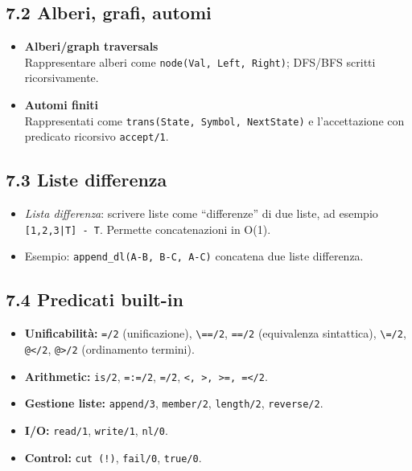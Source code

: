 \documentclass[12pt]{article}
\begin{document}
\subsection*{7.2 Alberi, grafi, automi}

\begin{itemize}
  \item \textbf{Alberi/graph traversals}\\
    Rappresentare alberi come \texttt{node(Val, Left, Right)}; DFS/BFS scritti ricorsivamente.
  \item \textbf{Automi finiti}\\
    Rappresentati come \texttt{trans(State, Symbol, NextState)} e l’accettazione con predicato ricorsivo \texttt{accept/1}.
\end{itemize}

\subsection*{7.3 Liste differenza}

\begin{itemize}
  \item \emph{Lista differenza}: scrivere liste come “differenze” di due liste, ad esempio \texttt{[1,2,3|T] - T}. Permette concatenazioni in O(1).
  \item Esempio: \texttt{append\_dl(A-B, B-C, A-C)} concatena due liste differenza.
\end{itemize}

\subsection*{7.4 Predicati built-in}

\begin{itemize}
  \item \textbf{Unificabilità:} \texttt{=/2} (unificazione), \texttt{\textbackslash==/2}, \texttt{==/2} (equivalenza sintattica), \texttt{\textbackslash=/2}, \texttt{@</2}, \texttt{@>/2} (ordinamento termini).
  \item \textbf{Arithmetic:} \texttt{is/2}, \texttt{=:=/2}, \texttt{=\=/2}, \texttt{<, >, >=, =</2}.
  \item \textbf{Gestione liste:} \texttt{append/3}, \texttt{member/2}, \texttt{length/2}, \texttt{reverse/2}.
  \item \textbf{I/O:} \texttt{read/1}, \texttt{write/1}, \texttt{nl/0}.
  \item \textbf{Control:} \texttt{cut (!)}, \texttt{fail/0}, \texttt{true/0}.
\end{itemize}
\end{document}
